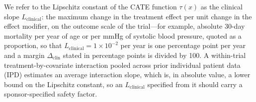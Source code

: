 \documentclass[AMA,Times1COL]{WileyNJDv5}
\begin{document}
We refer to the Lipschitz constant of the CATE function $\tau(x)$ as the clinical slope $L_{\text{clinical}}$: the maximum change in the treatment effect per unit change in the effect modifier, on the outcome scale of the trial---for example, absolute 30-day mortality per year of age or per mmHg of systolic blood pressure, quoted as a proportion, so that $L_{\text{clinical}} = 1 \times 10^{-2}$ per year is one percentage point per year and a margin $\Delta_{\text{clin}}$ stated in percentage points is divided by 100. A within-trial treatment-by-covariate interaction pooled across prior individual patient data (IPD)\cite{fisher2017} estimates an average interaction slope, which is, in absolute value, a lower bound on the Lipschitz constant, so an $L_{\text{clinical}}$ specified from it should carry a sponsor-specified safety factor.
\end{document}
